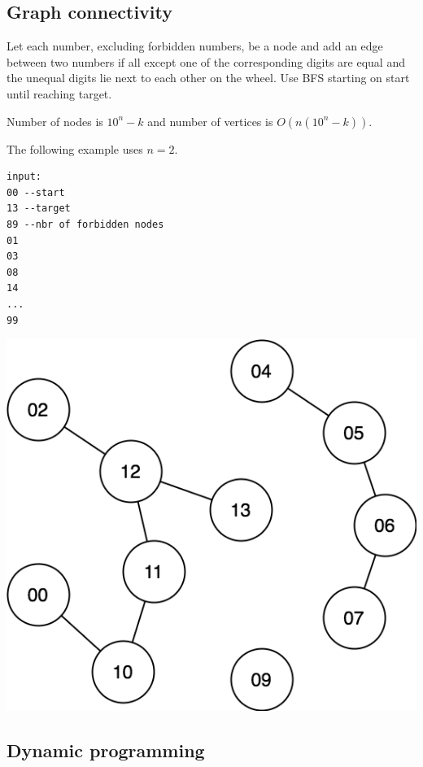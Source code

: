 \documentclass[a4paper]{article}
\newenvironment{task}[1]
{
	\begin{description}[align=right]
		\item [#1]
}{		%
	\end{description}
}
\DeclareMathOperator{\*}{\cdot}
\begin{document}
\subsection*{Graph connectivity}

\begin{task}{5. (a)}
\end{task}

\pagebreak
\begin{task}{(b)}
	\qquad Let each number, excluding forbidden numbers, be a node and add an edge between two numbers if all except one of the corresponding digits are equal and the unequal digits lie next to each other on the wheel. Use BFS starting on start until reaching target.
	
	Number of nodes is $10^n-k$ and number of vertices is $O(n(10^n-k))$.
	
	The following example uses $n=2$.
	
\begin{lstlisting}
input:
00 --start
13 --target
89 --nbr of forbidden nodes
01
03
08
14
...
99
\end{lstlisting}
	
	\includegraphics[scale=0.3]{110825-5b.png}
\end{task}

\subsection*{Dynamic programming}
\end{document}
